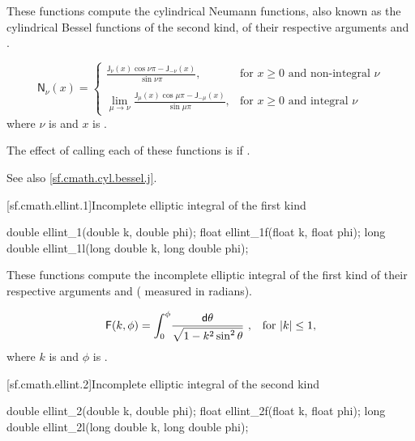 \begin{itemdescr}

\pnum\effects
These functions compute the cylindrical Neumann functions,
also known as the cylindrical Bessel functions of the second kind,
of their respective arguments
 and .

\pnum\returns
\[%
  \mathsf{N}_\nu(x) =
  \left\{
  \begin{array}{cl}
  \displaystyle
  \frac{\mathsf{J}_\nu(x) \cos \nu\pi - \mathsf{J}_{-\nu}(x)}
       {\sin \nu\pi },
  & \mbox{for $x \ge 0$ and non-integral $\nu$}
  \\
  \\
  \displaystyle
  \lim_{\mu \rightarrow \nu} \frac{\mathsf{J}_\mu(x) \cos \mu\pi - \mathsf{J}_{-\mu}(x)}
                                {\sin \mu\pi },
  & \mbox{for $x \ge 0$ and integral $\nu$}
  \end{array}
  \right.
\]
where
$\nu$ is  and
$x$ is .

\pnum\remarks
The effect of calling each of these functions
is 
if .

\pnum See also \ref{sf.cmath.cyl.bessel.j}.
\end{itemdescr}

[sf.cmath.ellint.1]{Incomplete elliptic integral of the first kind}%
%
%
%
%
%
\begin{itemdecl}
double       ellint_1(double k, double phi);
float        ellint_1f(float k, float phi);
long double  ellint_1l(long double k, long double phi);
\end{itemdecl}

\begin{itemdescr}
\pnum
\effects
These functions compute
the incomplete elliptic integral of the first kind
of their respective arguments
 and  ( measured in radians).

\pnum
\returns
\[ \mathsf{F}(k, \phi) =
     \int_0^\phi \! \frac{\mathsf{d}\theta}{\sqrt{1 - k^2 \sin^2 \theta}}
     \text{ ,\quad for $|k| \le 1$,} \]
where
$k$ is  and
$\phi$ is .
\end{itemdescr}

[sf.cmath.ellint.2]{Incomplete elliptic integral of the second kind}%
%
%
%
%
%
\begin{itemdecl}
double       ellint_2(double k, double phi);
float        ellint_2f(float k, float phi);
long double  ellint_2l(long double k, long double phi);
\end{itemdecl}

